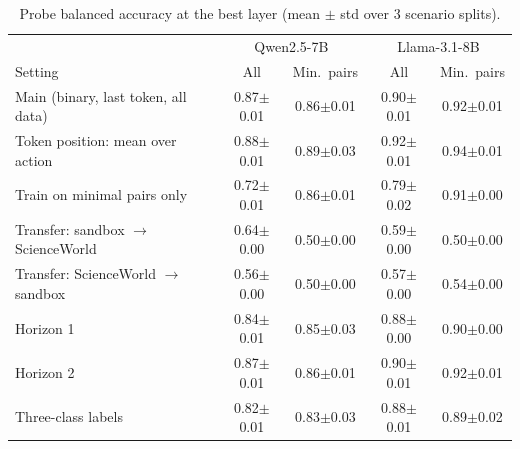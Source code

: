 \begin{table}[t]
\centering\small
\begin{tabular}{lcccc}
\toprule
 & \multicolumn{2}{c}{Qwen2.5-7B} & \multicolumn{2}{c}{Llama-3.1-8B} \\
Setting & All & Min.\ pairs & All & Min.\ pairs \\
\midrule
Main (binary, last token, all data) & 0.87$\pm$0.01 & 0.86$\pm$0.01 & 0.90$\pm$0.01 & 0.92$\pm$0.01 \\
Token position: mean over action & 0.88$\pm$0.01 & 0.89$\pm$0.03 & 0.92$\pm$0.01 & 0.94$\pm$0.01 \\
Train on minimal pairs only & 0.72$\pm$0.01 & 0.86$\pm$0.01 & 0.79$\pm$0.02 & 0.91$\pm$0.00 \\
Transfer: sandbox $\rightarrow$ ScienceWorld & 0.64$\pm$0.00 & 0.50$\pm$0.00 & 0.59$\pm$0.00 & 0.50$\pm$0.00 \\
Transfer: ScienceWorld $\rightarrow$ sandbox & 0.56$\pm$0.00 & 0.50$\pm$0.00 & 0.57$\pm$0.00 & 0.54$\pm$0.00 \\
Horizon 1 & 0.84$\pm$0.01 & 0.85$\pm$0.03 & 0.88$\pm$0.00 & 0.90$\pm$0.00 \\
Horizon 2 & 0.87$\pm$0.01 & 0.86$\pm$0.01 & 0.90$\pm$0.01 & 0.92$\pm$0.01 \\
Three-class labels & 0.82$\pm$0.01 & 0.83$\pm$0.03 & 0.88$\pm$0.01 & 0.89$\pm$0.02 \\
\bottomrule
\end{tabular}
\caption{Probe balanced accuracy at the best layer (mean $\pm$ std over 3 scenario splits).}
\label{tab:ablation}
\end{table}